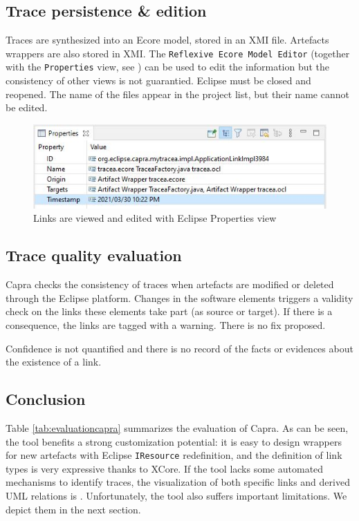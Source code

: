 \subsection{Trace persistence \& edition}
Traces are synthesized into an Ecore model, stored in an XMI file. Artefacts wrappers are also stored in XMI.
The \texttt{Reflexive Ecore Model Editor} (together with the \texttt{Properties} view, see  ) can be used to edit the information but the consistency of other views is not guarantied. Eclipse must be closed and reopened.
The name of the files appear in the project list, but their name cannot be edited.
\begin{figure}[h] 
	\centering
	\includegraphics[width=.65\linewidth]{images/properties.jpg}
	\caption{Links are viewed and edited with Eclipse Properties view}
	\label{fig:properties}
\end{figure}

\subsection{Trace quality evaluation}
Capra checks the consistency of traces when artefacts are modified or deleted through the Eclipse platform. Changes in the software elements triggers a validity check on the links these elements take part (as source or target). If there is a consequence, the links are tagged with a warning. There is no fix proposed.

Confidence is not quantified and there is no record of the facts or evidences about the existence of a link.

\subsection{Conclusion}

Table \ref{tab:evaluationcapra} summarizes the evaluation of Capra. As can be seen, the tool benefits a strong customization potential: it is easy to design wrappers for new artefacts with Eclipse \texttt{IResource} redefinition, and the definition of link types is very expressive thanks to XCore. If the tool lacks some automated mechanisms to identify traces, the visualization of both specific links and derived UML relations is .
Unfortunately, the tool also suffers important limitations. We depict them in the next section. 


